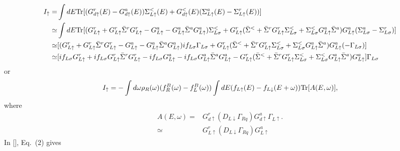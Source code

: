 \documentclass[aps,prb,superscriptaddress]{revtex4-2}
\begin{document}
\begin{equation}
\begin{split}
I_\uparrow =&\int dE {\rm Tr} [(G_{d\uparrow}^r(E)-G_{d\uparrow}^a(E))\Sigma^<_{L\uparrow}(E) +G_{d\uparrow}^<(E) (\Sigma_{L\uparrow}^a(E) -\Sigma_{L\uparrow}^r(E))] \\
\simeq&\int dE {\rm Tr} [(G^r_{L\uparrow} + G^r_{L\uparrow} {\bar \Sigma}^r G^r_{L\uparrow} - G^a_{L\uparrow} - G^a_{L\uparrow} {\bar \Sigma}^a G^a_{L\uparrow})\Sigma_{L\sigma}^{<} + G^r_{L\uparrow}( \bar\Sigma^{<} +  {\bar \Sigma}^r G^r_{L\uparrow}\Sigma_{L\sigma}^{<} + \Sigma_{L\sigma}^{<} G^a_{L\uparrow} {\bar \Sigma}^a )G^a_{L\uparrow} (\Sigma_{L\sigma}^{a}-\Sigma_{L\sigma}^{r})] \\
\simeq& [(G^r_{L\uparrow} + G^r_{L\uparrow} {\bar \Sigma}^r G^r_{L\uparrow} - G^a_{L\uparrow} - G^a_{L\uparrow} {\bar \Sigma}^a G^a_{L\uparrow})if_{L\sigma}\Gamma_{L\sigma} + G^r_{L\uparrow}( \bar\Sigma^{<} +  {\bar \Sigma}^r G^r_{L\uparrow}\Sigma_{L\sigma}^{<} + \Sigma_{L\sigma}^{<} G^a_{L\uparrow} {\bar \Sigma}^a )G^a_{L\uparrow} (-\Gamma_{L\sigma})] \\
\simeq& [if_{L\sigma}G^r_{L\uparrow} + if_{L\sigma}G^r_{L\uparrow} {\bar \Sigma}^r G^r_{L\uparrow} - if_{L\sigma}G^a_{L\uparrow} - if_{L\sigma}G^a_{L\uparrow} {\bar \Sigma}^a G^a_{L\uparrow} - G^r_{L\uparrow}( \bar\Sigma^{<} +  {\bar \Sigma}^r G^r_{L\uparrow}\Sigma_{L\sigma}^{<} + \Sigma_{L\sigma}^{<} G^a_{L\uparrow} {\bar \Sigma}^a )G^a_{L\uparrow}] \Gamma_{L\sigma}
\end{split}
\end{equation}
or
\begin{eqnarray}
I_\uparrow = -\int d\omega \rho_R(\omega) (f^B_R(\omega)-f^B_L(\omega))\int dE (f_{L\uparrow}(E)-f_{L\downarrow}(E+\omega)) {\rm Tr}[A(E,\omega)] ,
\end{eqnarray}
where
\begin{equation}
\begin{split}
A(E,\omega)=&G^r_{d\uparrow} (D_{L\downarrow} \Gamma_{Rq}) G^a_{d\uparrow}\Gamma_{L\uparrow} .\\
\simeq&G^r_{L\uparrow}(D_{L\downarrow} \Gamma_{Rq}) G^a_{L\uparrow} 
 \end{split}
\end{equation}
In [], Eq.~(2) gives
\end{document}
